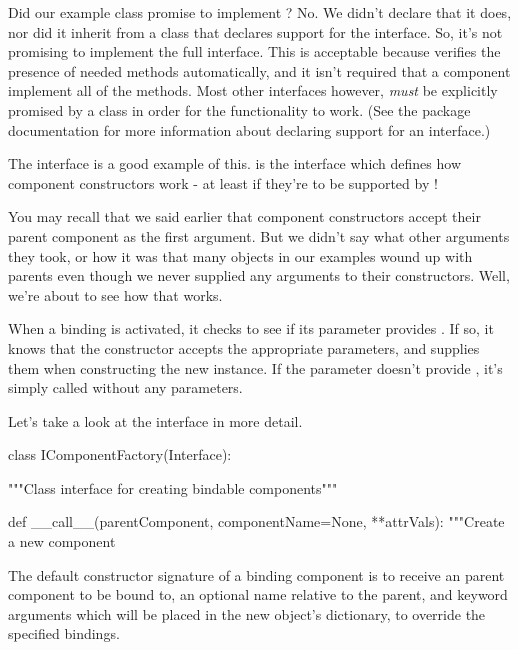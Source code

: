 \begin{verbatim%
}
\begin{verbatim%
}
\begin{verbatim%
}
\begin{verbatim%
}
\begin{verbatim%
}
\begin{verbatim%
}
\begin{verbatim%
}
\begin{verbatim%
}
\begin{verbatim%
}
\begin{verbatim%
}
\begin{verbatim%
}
\begin{verbatim%
}
\begin{verbatim%
}
\begin{verbatim%
}
\begin{verbatim%
}
\begin{verbatim%
}
Did our example  class promise to implement ?  No.  We didn't declare that it does, nor did it inherit
from a class that declares support for the interface.  So, it's not promising
to implement the full  interface.  This is acceptable
because  verifies the presence of needed methods
automatically, and it isn't required that a component implement all of the
 methods.  Most other interfaces however, \emph{must} be
explicitly promised by a class in order for the functionality to work.
(See the  package documentation for more information about
declaring support for an interface.)

The  interface is a good example of this.
 is the interface which defines how component
constructors work - at least if they're to be supported by !

You may recall that we said earlier that component constructors accept their
parent component as the first argument.  But we didn't say what other
arguments they took, or how it was that many objects in our examples wound up
with parents even though we never supplied any arguments to their constructors.
Well, we're about to see how that works.

When a  binding is activated, it checks to see if
its  parameter provides .  If so,
it knows that the constructor accepts the appropriate parameters, and supplies
them when constructing the new instance.  If the  parameter
doesn't provide , it's simply called without any
parameters.

Let's take a look at the  interface in more
detail.


\begin{verbatim%
}class IComponentFactory(Interface):

    """Class interface for creating bindable components"""

    def __call__(parentComponent, componentName=None, **attrVals):
        """Create a new component

        The default constructor signature of a binding component is
        to receive an parent component to be bound to, an optional name
        relative to the parent, and keyword arguments which will be
        placed in the new object's dictionary, to override the specified
        bindings.


\end{verbatim%
}
\end{verbatim%
}
\end{verbatim%
}
\end{verbatim%
}
\end{verbatim%
}
\end{verbatim%
}
\end{verbatim%
}
\end{verbatim%
}
\end{verbatim%
}
\end{verbatim%
}
\end{verbatim%
}
\end{verbatim%
}
\end{verbatim%
}
\end{verbatim%
}
\end{verbatim%
}
\end{verbatim%
}
\end{verbatim%
}
